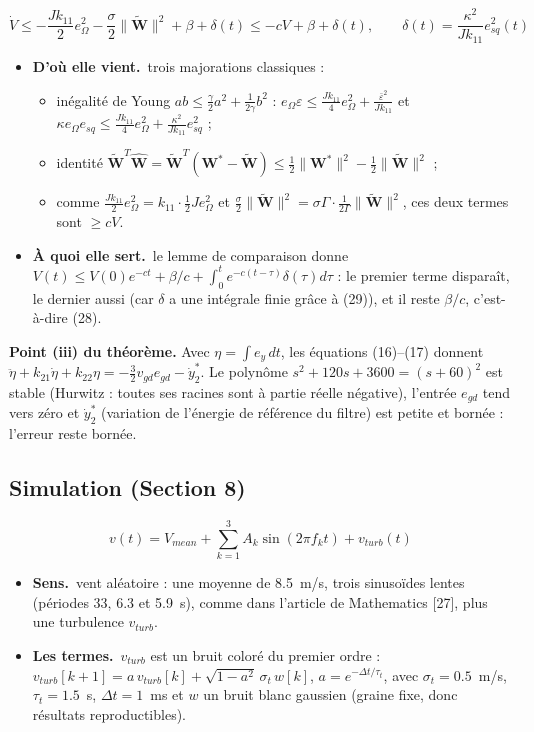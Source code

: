 \documentclass[11pt,a4paper]{article}
\newcommand{\bv}[1]{\mathbf{#1}}
\newenvironment{expl}{\begin{itemize}[leftmargin=1.2em,itemsep=2pt,topsep=2pt]}{\end{itemize}}
\newcommand{\sens}{\item \textbf{Sens.}~}
\newcommand{\termes}{\item \textbf{Les termes.}~}
\newcommand{\origine}{\item \textbf{D'où elle vient.}~}
\newcommand{\role}{\item \textbf{À quoi elle sert.}~}
\begin{document}
\begin{equation}\tag{33}
\dot V\le-\frac{Jk_{11}}{2}e_\Omega^2-\frac\sigma2\|\tilde{\bv{W}}\|^2+\beta+\delta(t)\le-cV+\beta+\delta(t),
\qquad \delta(t)=\frac{\kappa^2}{Jk_{11}}e_{sq}^2(t)
\end{equation}
\begin{expl}
\origine trois majorations classiques :
\begin{itemize}[itemsep=1pt]
\item inégalité de Young $ab\le\frac{\gamma}{2}a^2+\frac{1}{2\gamma}b^2$ :
$e_\Omega\varepsilon\le\frac{Jk_{11}}{4}e_\Omega^2+\frac{\bar\varepsilon^2}{Jk_{11}}$ et
$\kappa e_\Omega e_{sq}\le\frac{Jk_{11}}{4}e_\Omega^2+\frac{\kappa^2}{Jk_{11}}e_{sq}^2$ ;
\item identité $\tilde{\bv W}^T\hat{\bv W}=\tilde{\bv W}^T(\bv W^*-\tilde{\bv W})\le\frac12\|\bv W^*\|^2-\frac12\|\tilde{\bv W}\|^2$ ;
\item comme $\frac{Jk_{11}}{2}e_\Omega^2=k_{11}\cdot\frac12Je_\Omega^2$ et
$\frac\sigma2\|\tilde{\bv W}\|^2=\sigma\Gamma\cdot\frac{1}{2\Gamma}\|\tilde{\bv W}\|^2$, ces deux termes sont $\ge cV$.
\end{itemize}
\role le lemme de comparaison donne $V(t)\le V(0)e^{-ct}+\beta/c+\int_0^te^{-c(t-\tau)}\delta(\tau)d\tau$ :
le premier terme disparaît, le dernier aussi (car $\delta$ a une intégrale finie grâce à (29)), et il reste
$\beta/c$, c'est-à-dire (28).
\end{expl}

\textbf{Point (iii) du théorème.} Avec $\eta=\int e_y\,dt$, les équations (16)--(17) donnent
$\ddot\eta+k_{21}\dot\eta+k_{22}\eta=-\frac32v_{gd}e_{gd}-\dot y_2^*$. Le polynôme $s^2+120s+3600=(s+60)^2$
est stable (Hurwitz : toutes ses racines sont à partie réelle négative), l'entrée $e_{gd}$ tend vers zéro
et $\dot y_2^*$ (variation de l'énergie de référence du filtre) est petite et bornée : l'erreur reste bornée.

\subsection{Simulation (Section 8)}
\begin{equation}\tag{34}
v(t) = V_{mean} + \sum_{k=1}^{3} A_k\sin(2\pi f_k t) + v_{turb}(t)
\end{equation}
\begin{expl}
\sens vent aléatoire : une moyenne de 8.5~m/s, trois sinusoïdes lentes (périodes 33, 6.3 et 5.9~s), comme
dans l'article de Mathematics [27], plus une turbulence $v_{turb}$.
\termes $v_{turb}$ est un bruit coloré du premier ordre :
$v_{turb}[k+1]=a\,v_{turb}[k]+\sqrt{1-a^2}\,\sigma_t\,w[k]$, $a=e^{-\Delta t/\tau_t}$, avec
$\sigma_t=0.5$~m/s, $\tau_t=1.5$~s, $\Delta t=1$~ms et $w$ un bruit blanc gaussien (graine fixe, donc
résultats reproductibles).
\end{expl}
\end{document}
